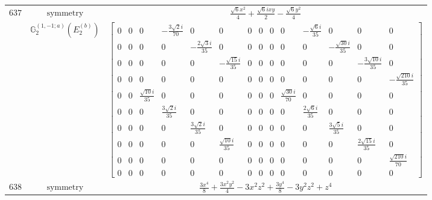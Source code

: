 \documentclass[fleqn,8pt,landscape]{jsarticle}
\begin{document}
\begin{longtable}{ccc}
$ 637 $ & $ \text{symmetry} $ & $ \frac{\sqrt{6} x^{2}}{4} + \frac{\sqrt{6} i x y}{2} - \frac{\sqrt{6} y^{2}}{4} $ \\
$  $ & $ \mathbb{G}_{2}^{(1,-1;a)}(E_{2}^{(b)}) $ & $ \begin{bmatrix} 0 & 0 & 0 & - \frac{3 \sqrt{2} i}{70} & 0 & 0 & 0 & 0 & 0 & 0 & - \frac{\sqrt{6} i}{35} & 0 & 0 & 0 \\ 0 & 0 & 0 & 0 & - \frac{2 \sqrt{3} i}{35} & 0 & 0 & 0 & 0 & 0 & 0 & - \frac{\sqrt{30} i}{35} & 0 & 0 \\ 0 & 0 & 0 & 0 & 0 & - \frac{\sqrt{15} i}{35} & 0 & 0 & 0 & 0 & 0 & 0 & - \frac{3 \sqrt{10} i}{35} & 0 \\ 0 & 0 & 0 & 0 & 0 & 0 & 0 & 0 & 0 & 0 & 0 & 0 & 0 & - \frac{\sqrt{210} i}{35} \\ 0 & 0 & \frac{\sqrt{10} i}{35} & 0 & 0 & 0 & 0 & 0 & 0 & \frac{\sqrt{30} i}{70} & 0 & 0 & 0 & 0 \\ 0 & 0 & 0 & \frac{3 \sqrt{2} i}{35} & 0 & 0 & 0 & 0 & 0 & 0 & \frac{2 \sqrt{6} i}{35} & 0 & 0 & 0 \\ 0 & 0 & 0 & 0 & \frac{3 \sqrt{2} i}{35} & 0 & 0 & 0 & 0 & 0 & 0 & \frac{3 \sqrt{5} i}{35} & 0 & 0 \\ 0 & 0 & 0 & 0 & 0 & \frac{\sqrt{10} i}{35} & 0 & 0 & 0 & 0 & 0 & 0 & \frac{2 \sqrt{15} i}{35} & 0 \\ 0 & 0 & 0 & 0 & 0 & 0 & 0 & 0 & 0 & 0 & 0 & 0 & 0 & \frac{\sqrt{210} i}{70} \\ 0 & 0 & 0 & 0 & 0 & 0 & 0 & 0 & 0 & 0 & 0 & 0 & 0 & 0 \end{bmatrix} $ \\ \hline
$ 638 $ & $ \text{symmetry} $ & $ \frac{3 x^{4}}{8} + \frac{3 x^{2} y^{2}}{4} - 3 x^{2} z^{2} + \frac{3 y^{4}}{8} - 3 y^{2} z^{2} + z^{4} $ \\

\end{longtable}
\end{document}
